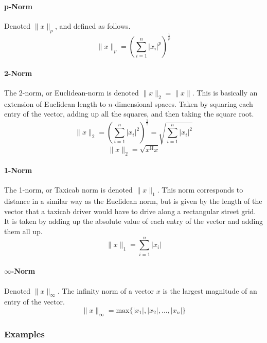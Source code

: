 \paragraph{p-Norm}
Denoted $\|x\|_{p}$, and defined as follows.
\begin{equation*}
  \|x\|_{p}=\left(\sum_{i=1}^{n}|x_{i}|^{p}\right)^{\frac{1}{p}}
\end{equation*}

\paragraph{2-Norm}
The 2-norm, or Euclidean-norm is denoted $\|x\|_{2}=\|x\|$.
This is basically an extension of Euclidean length to $n$-dimensional spaces.
Taken by squaring each entry of the vector, adding up all the squares, and then taking the square root.
\begin{equation*}
  \|x\|_{2}=\left(\sum_{i=1}^{n}|x_{i}|^{2}\right)^{\frac{1}{2}}=\sqrt{\sum_{i=1}^{n}|x_{i}|^{2}}
\end{equation*}
\begin{equation*}
  \|x\|_{2}=\sqrt{x^{\text{H}}x}
\end{equation*}

\paragraph{1-Norm}
The 1-norm, or Taxicab norm is denoted $\|x\|_{1}$.
This norm corresponds to distance in a similar way as the Euclidean norm, but is given by the length of the vector that a taxicab driver would have to drive along a rectangular street grid.
It is taken by adding up the absolute value of each entry of the vector and adding them all up.
\begin{equation*}
  \|x\|_{1}=\sum_{i=1}^{n}|x_{i}|
\end{equation*}

\paragraph{$\infty$-Norm}
Denoted $\|x\|_{\infty}$.
The infinity norm of a vector $x$ is the largest magnitude of an entry of the vector.
\begin{equation*}
  \|x\|_{\infty}=\text{max}\{|x_{1}|,|x_{2}|,\dots,|x_{n}|\}
\end{equation*}

\subsubsection{Examples}

